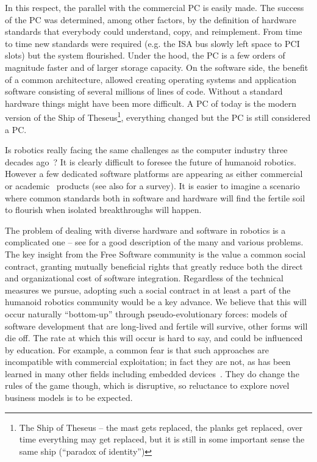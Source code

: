 In this respect, the parallel with the commercial PC is easily made. 
The success of the PC was determined, among other factors, by the definition 
of hardware standards that everybody could understand, copy, and reimplement. 
From time to time new standards were required (e.g. the ISA bus slowly left
space to PCI slots) but the system flourished. Under the hood, the PC is a 
few orders of magnitude faster and of larger
storage capacity. On the software side, the benefit of a common architecture, 
allowed creating operating systems and application software consisting of 
several millions of lines of code. Without a standard hardware things
might have been more difficult.
%
A PC of today is the modern 
version of the Ship of Theseus\footnote{The Ship of 
Theseus -- the mast gets replaced,
the planks get replaced, over time everything may get replaced,
but it is still in some important sense the same ship (``paradox
of identity'')}, everything changed but the PC is still considered
a PC. 
%

Is robotics really facing the same challenges as the computer industry
three decades ago~\cite{gates2007robot}? 
%
It is clearly difficult to foresee the future of humanoid robotics. However
a few dedicated software platforms are appearing as either 
commercial~\cite{microsoft}
or academic~\cite{vaughan2006reusable} products (see also 
\cite{kramer2007development} for a survey). It is
easier %
to imagine a scenario where common standards both in 
software and hardware will find the fertile soil to flourish when 
isolated breakthroughs will happen.
%
%
%

The problem of dealing with diverse hardware and software 
in robotics is a complicated one -- see \cite{nesnas2006claraty} 
for a good description of the many and various problems.
%
The key insight from the Free Software community is the value
a common social contract, granting mutually beneficial rights
that greatly reduce both the direct and organizational cost
of software integration.  Regardless of the technical
measures we pursue, adopting such a social contract
in at least a part of the humanoid robotics community would
be a key advance.
%
We believe that this will occur naturally ``bottom-up''
through pseudo-evolutionary forces: models of software 
development that are long-lived and fertile will survive,
other forms will die off.
%
The rate at which this will occur is hard to say,
and could be influenced by education.
%
For example, a common fear is that such approaches are incompatible
with commercial exploitation; in fact they are not, as has been
learned in many other fields including embedded
devices~\cite{henkel2006selective}.  They do change the rules of the
game though, which is disruptive, so reluctance to explore novel
business models is to be expected.

